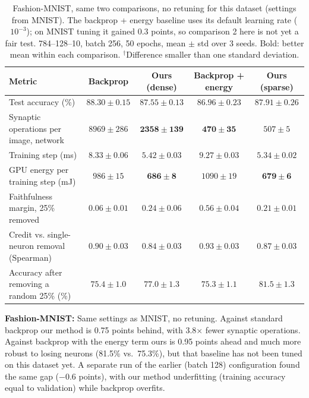 \documentclass{article}
\begin{document}
\begin{table}[H]
\centering
\small
\caption{Fashion-MNIST, same two comparisons, no retuning for this dataset (settings from MNIST). The backprop + energy baseline uses its default learning rate ($10^{-3}$); on MNIST tuning it gained 0.3 points, so comparison 2 here is not yet a fair test. 784--128--10, batch 256, 50 epochs, mean $\pm$ std over 3 seeds. Bold: better mean within each comparison. $^\dagger$Difference smaller than one standard deviation.}
\label{tab:fashion}
\begin{tabular}{lcccc}
\toprule
Metric & Backprop & Ours (dense) & Backprop + energy & Ours (sparse) \\
\midrule
Test accuracy (\%) & $\boldsymbol{88.30 \pm 0.15}$ & $87.55 \pm 0.13$ & $86.96 \pm 0.23$ & $\boldsymbol{87.91 \pm 0.26}$ \\
Synaptic operations per image, network & $8969 \pm 286$ & $\boldsymbol{2358 \pm 139}$ & $\boldsymbol{470 \pm 35}$ & $507 \pm 5$ \\
Training step (ms) & $8.33 \pm 0.06$ & $\boldsymbol{5.42 \pm 0.03}$ & $9.27 \pm 0.03$ & $\boldsymbol{5.34 \pm 0.02}$ \\
GPU energy per training step (mJ) & $986 \pm 15$ & $\boldsymbol{686 \pm 8}$ & $1090 \pm 19$ & $\boldsymbol{679 \pm 6}$ \\
Faithfulness margin, 25\% removed & $0.06 \pm 0.01$ & $\boldsymbol{0.24 \pm 0.06}$ & $\boldsymbol{0.56 \pm 0.04}$ & $0.21 \pm 0.01$ \\
Credit vs. single-neuron removal (Spearman) & $\boldsymbol{0.90 \pm 0.03}$ & $0.84 \pm 0.03$ & $\boldsymbol{0.93 \pm 0.03}$ & $0.87 \pm 0.03$ \\
Accuracy after removing a random 25\% (\%) & $75.4 \pm 1.0$ & $\boldsymbol{77.0 \pm 1.3}$ & $75.3 \pm 1.1$ & $\boldsymbol{81.5 \pm 1.3}$ \\
\bottomrule
\end{tabular}
\end{table}

{\small
\noindent\textbf{Fashion-MNIST:} Same settings as MNIST, no retuning. Against standard backprop our method is
0.75 points behind, with 3.8$\times$ fewer synaptic operations. Against backprop with the energy term ours is 0.95
points ahead and much more robust to losing neurons (81.5\% vs.\ 75.3\%), but that baseline has not been tuned on
this dataset yet. A separate run of the earlier (batch 128) configuration found the same gap ($-0.6$ points), with
our method underfitting (training accuracy equal to validation) while backprop overfits.
}
\end{document}
